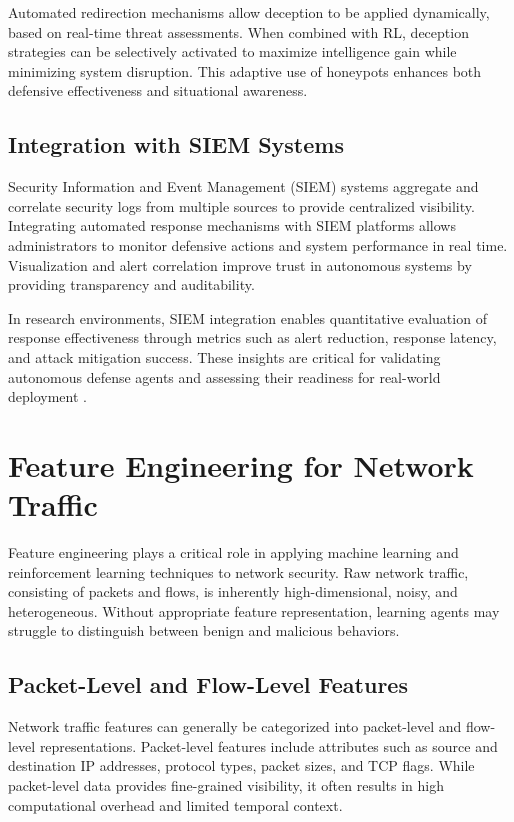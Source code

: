 \documentclass[12pt,a4paper]{report}
\begin{document}
Automated redirection mechanisms allow deception to be applied dynamically, based on real-time threat assessments.
When combined with RL, deception strategies can be selectively activated to maximize intelligence gain while minimizing system disruption.
This adaptive use of honeypots enhances both defensive effectiveness and situational awareness.

\subsection{Integration with SIEM Systems}

Security Information and Event Management (SIEM) systems aggregate and correlate security logs from multiple sources to provide centralized visibility.
Integrating automated response mechanisms with SIEM platforms allows administrators to monitor defensive actions and system performance in real time.
Visualization and alert correlation improve trust in autonomous systems by providing transparency and auditability.

In research environments, SIEM integration enables quantitative evaluation of response effectiveness through metrics such as alert reduction, response latency, and attack mitigation success.
These insights are critical for validating autonomous defense agents and assessing their readiness for real-world deployment \cite{ibmSOAR2023,honeypotSurvey2021}.

\section{Feature Engineering for Network Traffic}

Feature engineering plays a critical role in applying machine learning and reinforcement learning techniques to network security.
Raw network traffic, consisting of packets and flows, is inherently high-dimensional, noisy, and heterogeneous.
Without appropriate feature representation, learning agents may struggle to distinguish between benign and malicious behaviors.

\subsection{Packet-Level and Flow-Level Features}

Network traffic features can generally be categorized into packet-level and flow-level representations.
Packet-level features include attributes such as source and destination IP addresses, protocol types, packet sizes, and TCP flags.
While packet-level data provides fine-grained visibility, it often results in high computational overhead and limited temporal context.
\end{document}
